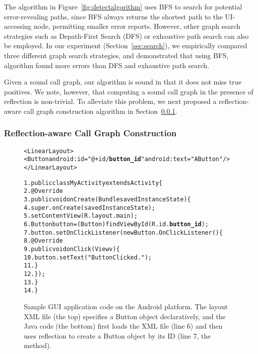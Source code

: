 The algorithm in Figure~\ref{fig:detectalgorithm} uses BFS to search
for potential error-revealing paths, since BFS always returns the
shortest path to the UI-accessing node, permitting
smaller error reports. However,
other graph search strategies such as Depath-First Search (DFS) or
exhaustive path search can also be employed. In our experiment (Section~\ref{sec:search}),
we empirically compared three different graph search strategies, and demonstrated that
using BFS, algorithm found more errors than DFS and
exhaustive path search.

Given a sound call graph, our algorithm is sound in that it does not
miss true positives. We note, however, that computing a sound
call graph in the presence of reflection is non-trivial. 
To alleviate this problem, we next proposed a reflection-aware call graph
construction algorithm in Section~\ref{sec:cg}.

\subsubsection{Reflection-aware Call Graph Construction}
\label{sec:cg}

% 

\begin{figure}[t]
\begin{CodeOut}
\begin{alltt}
<LinearLayout>
    <Button android:id="@+id/\textbf{button\_id}" android:text="A Button" />
</LinearLayout>

1. public class MyActivity extends Activity \{
2.    @Override
3.    public void onCreate(Bundle savedInstanceState) \{
4.        super.onCreate(savedInstanceState);
5.        setContentView(R.layout.main);
6.        Button button = (Button) findViewById(R.id.\textbf{button\_id});
7.        button.setOnClickListener(new Button.OnClickListener() \{
8.            @Override
9.            public void onClick(View v) \{
10.               button.setText("Button Clicked.");
11.           \}
12.       \});
13.   \}
14. \}
\end{alltt}
\end{CodeOut}
\vspace*{-3.0ex} \caption{Sample GUI application code on the Android platform. The layout
XML file (the top) specifies a Button object declaratively, 
and the Java code (the bottom)
first loads the XML file (line 6) and then uses reflection to create
a Button object by its ID (line 7, the  method).}
\label{fig:sampleandroid}
\end{figure}



